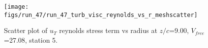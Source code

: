 \begin{figure}[H]
\centering
\texttt{[image: figs/run\_47/run\_47\_turb\_visc\_reynolds\_vs\_r\_meshscatter]}
\caption{Scatter plot of $
u_T$ reynolds stress term vs radius at $z/c$=9.00, $V_{free}$=27.08, station 5.}
\label{fig:run_47_turb_visc_reynolds_vs_r_meshscatter}
\end{figure}


